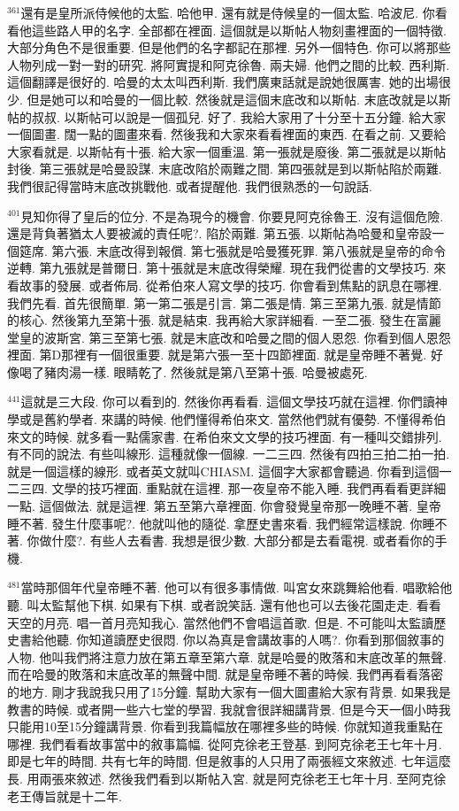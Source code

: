 \documentclass{book}
\begin{document}
$^{361}$還有是皇所派侍候他的太監.
哈他甲.
還有就是侍候皇的一個太監.
哈波尼.
你看看他這些路人甲的名字.
全部都在裡面.
這個就是以斯帖人物刻畫裡面的一個特徵.
大部分角色不是很重要.
但是他們的名字都記在那裡.
另外一個特色.
你可以將那些人物列成一對一對的研究.
將阿實提和阿克徐魯.
兩夫婦.
他們之間的比較.
西利斯.
這個翻譯是很好的.
哈曼的太太叫西利斯.
我們廣東話就是說她很厲害.
她的出場很少.
但是她可以和哈曼的一個比較.
然後就是這個末底改和以斯帖.
末底改就是以斯帖的叔叔.
以斯帖可以說是一個孤兒.
好了.
我給大家用了十分至十五分鐘.
給大家一個圖畫.
闊一點的圖畫來看.
然後我和大家來看看裡面的東西.
在看之前.
又要給大家看就是.
以斯帖有十張.
給大家一個重溫.
第一張就是廢後.
第二張就是以斯帖封後.
第三張就是哈曼設謀.
末底改陷於兩難之間.
第四張就是到以斯帖陷於兩難.
我們很記得當時末底改挑戰他.
或者提醒他.
我們很熟悉的一句說話.

$^{401}$見知你得了皇后的位分.
不是為現今的機會.
你要見阿克徐魯王.
沒有這個危險.
還是背負著猶太人要被滅的責任呢?.
陷於兩難.
第五張.
以斯帖為哈曼和皇帝設一個筵席.
第六張.
末底改得到報償.
第七張就是哈曼獲死罪.
第八張就是皇帝的命令逆轉.
第九張就是普爾日.
第十張就是末底改得榮耀.
現在我們從書的文學技巧.
來看故事的發展.
或者佈局.
從希伯來人寫文學的技巧.
你會看到焦點的訊息在哪裡.
我們先看.
首先很簡單.
第一第二張是引言.
第二張是情.
第三至第九張.
就是情節的核心.
然後第九至第十張.
就是結束.
我再給大家詳細看.
一至二張.
發生在富麗堂皇的波斯宮.
第三至第七張.
就是末底改和哈曼之間的個人恩怨.
你看到個人恩怨裡面.
第D那裡有一個很重要.
就是第六張一至十四節裡面.
就是皇帝睡不著覺.
好像喝了豬肉湯一樣.
眼睛乾了.
然後就是第八至第十張.
哈曼被處死.

$^{441}$這就是三大段.
你可以看到的.
然後你再看看.
這個文學技巧就在這裡.
你們讀神學或是舊約學者.
來講的時候.
他們懂得希伯來文.
當然他們就有優勢.
不懂得希伯來文的時候.
就多看一點儒家書.
在希伯來文文學的技巧裡面.
有一種叫交錯排列.
有不同的說法.
有些叫線形.
這種就像一個線.
一二三四.
然後有四拍三拍二拍一拍.
就是一個這樣的線形.
或者英文就叫CHIASM.
這個字大家都會聽過.
你看到這個一二三四.
文學的技巧裡面.
重點就在這裡.
那一夜皇帝不能入睡.
我們再看看更詳細一點.
這個做法.
就是這裡.
第五至第六章裡面.
你會發覺皇帝那一晚睡不著.
皇帝睡不著.
發生什麼事呢?.
他就叫他的隨從.
拿歷史書來看.
我們經常這樣說.
你睡不著.
你做什麼?.
有些人去看書.
我想是很少數.
大部分都是去看電視.
或者看你的手機.

$^{481}$當時那個年代皇帝睡不著.
他可以有很多事情做.
叫宮女來跳舞給他看.
唱歌給他聽.
叫太監幫他下棋.
如果有下棋.
或者說笑話.
還有他也可以去後花園走走.
看看天空的月亮.
唱一首月亮知我心.
當然他們不會唱這首歌.
但是.
不可能叫太監讀歷史書給他聽.
你知道讀歷史很悶.
你以為真是會講故事的人嗎?.
你看到那個敘事的人物.
他叫我們將注意力放在第五章至第六章.
就是哈曼的敗落和末底改革的無聲.
而在哈曼的敗落和末底改革的無聲中間.
就是皇帝睡不著的時候.
我們再看看落密的地方.
剛才我說我只用了15分鐘.
幫助大家有一個大圖畫給大家有背景.
如果我是教書的時候.
或者開一些六七堂的學習.
我就會很詳細講背景.
但是今天一個小時我只能用10至15分鐘講背景.
你看到我篇幅放在哪裡多些的時候.
你就知道我重點在哪裡.
我們看看故事當中的敘事篇幅.
從阿克徐老王登基.
到阿克徐老王七年十月.
即是七年的時間.
共有七年的時間.
但是敘事的人只用了兩張經文來敘述.
七年這麼長.
用兩張來敘述.
然後我們看到以斯帖入宮.
就是阿克徐老王七年十月.
至阿克徐老王傳旨就是十二年.
\end{document}
